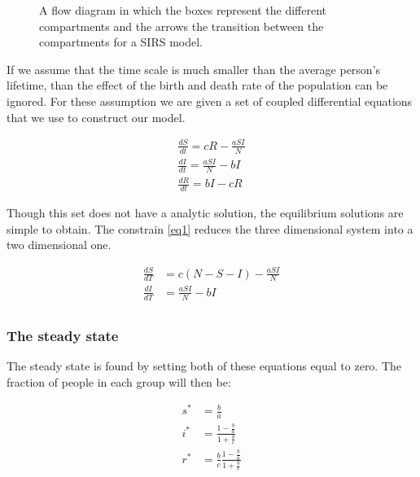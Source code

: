 \begin{figure}[h]
\center
{}
\caption{A flow diagram in which the boxes represent the different compartments and the arrows the transition between the compartments for a SIRS model.}
\label{fig:SIRS}
\end{figure}

If we assume that the time scale is much smaller than the average person's lifetime, than the effect of the birth and death rate of the population can be ignored. For these assumption we are given a set of coupled differential equations that we use to construct our model. 

\begin{align}
\frac{dS}{dt} = cR - \frac{aSI}{N}\\
\frac{dI}{dt} = \frac{aSI}{N} - bI\\
\frac{dR}{dt} = bI - cR
\end{align}


Though this set does not have a analytic solution, the equilibrium solutions are simple to obtain. The constrain \ref{eq1} reduces the three dimensional system into a two dimensional one.

\begin{align}
\frac{dS}{dT} &= c(N-S-I) - \frac{aSI}{N} \\
\frac{dI}{dT} &= \frac{aSI}{N} - bI\\
\end{align}

\subsubsection{The steady state}\label{sec:stady_state}
The steady state is found by setting both of these equations equal to zero. The fraction of people in each group will then be:

\begin{align}
s^* &= \frac{b}{a} \\
i^* &= \frac{1- \frac{b}{a}}{ 1 + \frac{b}{c}} \\
r^* &= \frac{b}{c} \frac{1- \frac{b}{a}}{ 1 + \frac{b}{c}}
\end{align}

